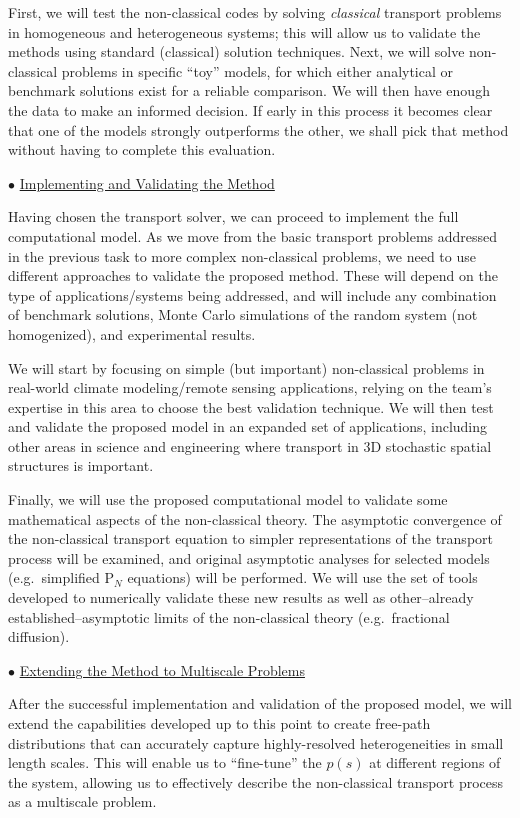 \documentclass[12pt]{article}
\begin{document}
First, we will test the non-classical codes by solving \textit{classical} transport problems in homogeneous and heterogeneous systems; this will allow us to validate the methods using standard (classical) solution techniques.
Next, we will solve non-classical problems in specific ``toy'' models, for which either analytical or benchmark solutions exist for a reliable comparison.
We will then have enough the data to make an informed decision.
If early in this process it becomes clear that one of the models strongly outperforms the other, we shall pick that method without having to complete this evaluation.

$\bullet$ \underline{Implementing and Validating the Method}

Having chosen the transport solver, we can proceed to implement the full computational model.
As we move from the basic transport problems addressed in the previous task to more complex non-classical problems, we need to use different approaches to validate the proposed method.
These will depend on the type of applications/systems being addressed, and will include any combination of benchmark solutions, Monte Carlo simulations of the random system (not homogenized), and experimental results.

We will start by focusing on simple (but important) non-classical problems in real-world climate modeling/remote sensing applications, relying on the team's expertise in this area to choose the best validation technique.
We will then test and validate the proposed model in an expanded set of applications, including other areas in science and engineering where transport in 3D stochastic spatial structures is important.

Finally, we will use the proposed computational model to validate some mathematical aspects of the non-classical theory.
The asymptotic convergence of the non-classical transport equation to simpler representations of the transport process will be examined, and original asymptotic analyses for selected models (e.g.\ simplified P$_N$ equations) will be performed.
We will use the set of tools developed to numerically validate these new results as well as other--already established--asymptotic limits of the non-classical theory (e.g.\ fractional diffusion).

$\bullet$ \underline{Extending the Method to Multiscale Problems}

After the successful implementation and validation of the proposed model, we will extend the capabilities developed up to this point to create free-path distributions that can accurately capture highly-resolved heterogeneities in small length scales.
This will enable us to ``fine-tune'' the $p(s)$ at different regions of the system, allowing us to effectively describe the non-classical transport process as a multiscale problem.
\end{document}
